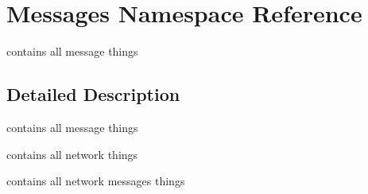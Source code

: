 \hypertarget{namespace_messages}{}\section{Messages Namespace Reference}
\label{namespace_messages}


contains all message things  




\subsection{Detailed Description}
contains all message things 

contains all network things

contains all network messages things 